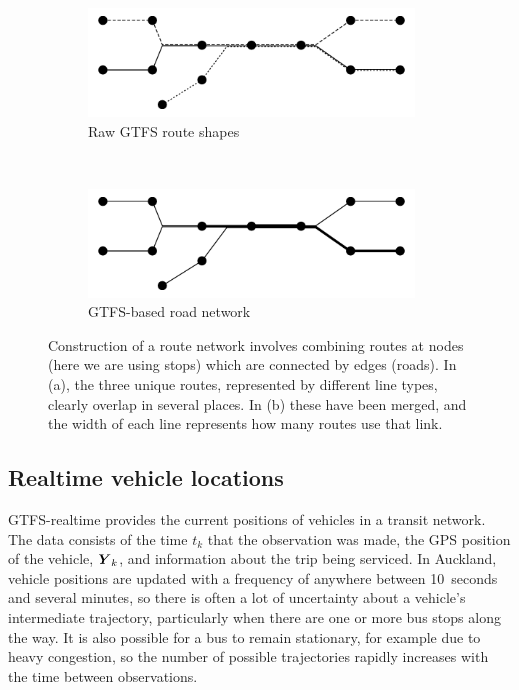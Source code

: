 \begin{figure}[tb]
    \centering
    \begin{subfigure}{0.7\textwidth}
        \centering
        \includegraphics[width=0.95\textwidth]{figures/02_network_segments_1.pdf}
        \caption{Raw GTFS route shapes}
        \label{fig:network_creation_1}
    \end{subfigure} \\
    \begin{subfigure}{0.7\textwidth}
        \centering
        \includegraphics[width=0.95\textwidth]{figures/02_network_segments_2.pdf}
        \caption{GTFS-based road network}
        \label{fig:network_creation_2}
    \end{subfigure}
    \caption{Construction of a route network involves combining routes at nodes %
        (here we are using stops) which are connected by edges (roads). %
        In (a), the three unique routes, represented by different line types, clearly %
        overlap in several places. In (b) these have been merged, and the width of each line %
        represents how many routes use that link.}
    \label{fig:network_creation}
\end{figure}


\subsection{Realtime vehicle locations}
\label{sec:realtime_data}

GTFS-realtime provides the current positions of vehicles in a transit network.
The data consists of the time $t_k$ that the observation was made,
the GPS position of the vehicle, $\mbox{$\boldsymbol{Y}$}_k$, 
and information about the trip being serviced.
In Auckland, vehicle positions are updated with a frequency of anywhere between 10~seconds and several minutes,
so there is often a lot of uncertainty about a vehicle's intermediate trajectory,
particularly when there are one or more bus stops along the way.
It is also possible for a bus to remain stationary,
for example due to heavy congestion,
so the number of possible trajectories rapidly increases with 
the time between observations.


